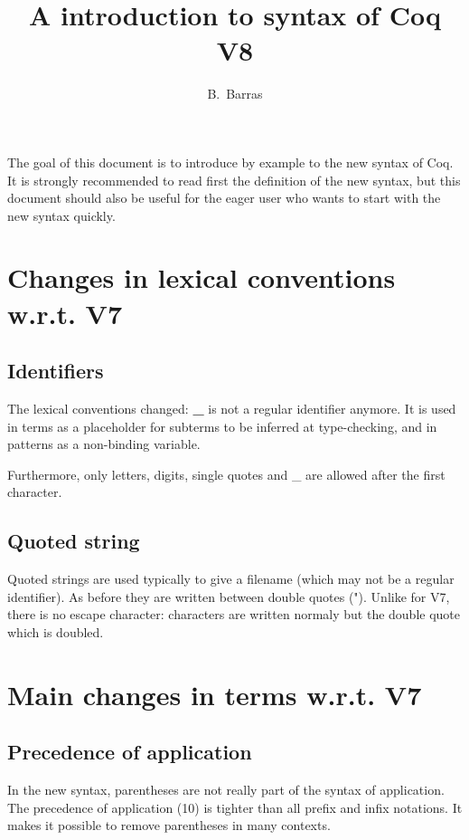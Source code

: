 \documentclass{article}
\author{B.~Barras}
\title{A introduction to syntax of Coq V8}
\def\TERM#1{\textsf{\bf #1}}
\begin{document}
\maketitle

The goal of this document is to introduce by example to the new syntax of
Coq. It is strongly recommended to read first the definition of the new
syntax, but this document should also be useful for the eager user who wants
to start with the new syntax quickly.


\section{Changes in lexical conventions w.r.t. V7}

\subsection{Identifiers}

The lexical conventions changed: \TERM{_} is not a regular identifier
anymore. It is used in terms as a placeholder for subterms to be inferred
at type-checking, and in patterns as a non-binding variable.

Furthermore, only letters, digits, single quotes and _ are allowed
after the first character.

\subsection{Quoted string}

Quoted strings are used typically to give a filename (which may not
be a regular identifier). As before they are written between double
quotes ("). Unlike for V7, there is no escape character: characters
are written normaly but the double quote which is doubled.

\section{Main changes in terms w.r.t. V7}


\subsection{Precedence of application}

In the new syntax, parentheses are not really part of the syntax of
application. The precedence of application (10) is tighter than all
prefix and infix notations. It makes it possible to remove parentheses
in many contexts.
\end{document}
